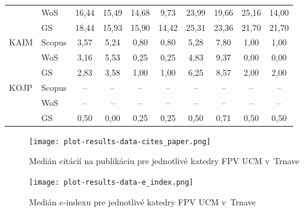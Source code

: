 \begin{table}
\begin{tabular}{llcccccccc}
      & WoS    & 16,44       & 15,49 & 14,68 & 9,73  & 23,99   & 19,66 & 25,16 & 14,00 \\
      & GS     & 18,44       & 15,93 & 15,90 & 14,42 & 25,31   & 23,36 & 21,70 & 21,70 \\[1ex]
 KAIM & Scopus & 3,57        & 5,24  & 0,80  & 0,80  & 5,28    & 7,80  & 1,00  & 1,00  \\
      & WoS    & 3,16        & 5,53  & 0,25  & 0,25  & 4,83    & 9,37  & 0,00  & 0,00  \\
      & GS     & 2,83        & 3,58  & 1,00  & 1,00  & 6,25    & 8,57  & 2,00  & 2,00  \\[1ex]
 KOJP & Scopus & --          & --    & --    & --    & --      & --    & --    & --    \\
      & WoS    & --          & --    & --    & --    & --      & --    & --    & --    \\
      & GS     & 0,50        & 0,00  & 0,25  & 0,25  & 0,50    & 0,71  & 0,50  & 0,50  \\[0.5ex]
  \bottomrule
\end{tabular}
\end{table}

\begin{figure}
  \centering
  \texttt{[image: plot-results-data-cites\_paper.png]}
  \caption{Medián citácií na publikáciu pre jednotlivé katedry FPV UCM v~Trnave}
  \label{fig:c/p.plot}
\end{figure}

\begin{figure}
  \centering
  \texttt{[image: plot-results-data-e\_index.png]}
  \caption{Medián $e$-indexu pre jednotlivé katedry FPV UCM v~Trnave}
  \label{fig:e-index.plot}
\end{figure}
\clearpage



